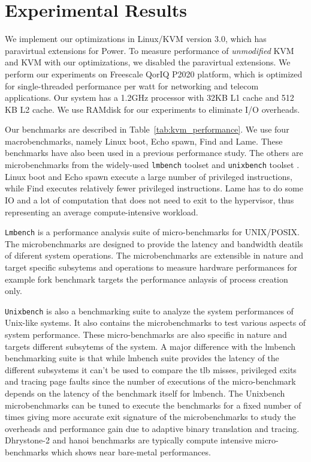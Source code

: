 \chapter{Experimental Results}\label{ch:6}
We implement our optimizations in Linux/KVM version 3.0, which has paravirtual extensions for Power. To measure performance of {\em unmodified} KVM and KVM with our optimizations, we disabled the paravirtual extensions. We perform our experiments on Freescale QorIQ P2020 platform, which is optimized for single-threaded performance per watt for networking and telecom applications. Our system has a 1.2GHz processor with 32KB L1 cache and 512 KB L2 cache. We use RAMdisk for our experiments to eliminate I/O overheads.

Our benchmarks are described in Table~\ref{tab:kvm_performance}. We use four macrobenchmarks, namely Linux boot, Echo spawn, Find and Lame. These benchmarks have also been used in a previous performance study\cite{kvm_ppc_exittimings}. The others are microbenchmarks from the widely-used {\tt lmbench} toolset\cite{lmbench} and {\tt unixbench} toolset \cite{unixbench}. Linux boot and Echo spawn execute a large number of privileged instructions, while Find executes relatively fewer privileged instructions. Lame has to do some IO and a lot of computation that does not need to exit to the hypervisor, thus representing an average compute-intensive workload. 

{\tt Lmbench} is a performance analysis suite of micro-benchmarks for UNIX/POSIX. The microbenchmarks are designed to provide the latency and bandwidth deatils of diferent system operations. The microbenchmarks are extensible in nature and target specific subsytems and operations to measure hardware performances for example fork benchmark targets the performance anlaysis of process creation only.

{\tt Unixbench} is also a benchmarking suite to analyze the system performances of Unix-like systems. It also contains the microbenchmarks to test various aspects of system performance. These micro-benchmarks are also specific in nature and targets different subsytems of the system. A major difference with the lmbench benchmarking suite is that while lmbench suite provides the latency of the different subsystems it can't be used to compare the tlb misses, privileged exits and tracing page faults since the number of executions of the micro-benchmark depends on the latency of the benchmark itself for lmbench. The Unixbench microbenchmarks can be tuned to execute the benchmarks for a fixed number of times giving more accurate exit signature of the microbenchmarks to study the overheads and performance gain due to adaptive binary translation and tracing. Dhrystone-2 and hanoi benchmarks are typically compute intensive micro-benchmarks which shows near bare-metal performances.

